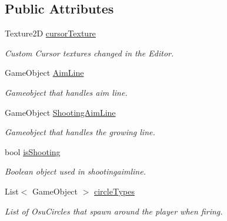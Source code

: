\subsection*{Public Attributes}
\begin{DoxyCompactItemize}
\item 
\mbox{\label{class_u_i_controller_aac6233fbba2e67548334fcebda846b13}} 
Texture2D \hyperlink{class_u_i_controller_aac6233fbba2e67548334fcebda846b13}{cursor\+Texture}
\begin{DoxyCompactList}\small\item\em Custom Cursor textures changed in the Editor. \end{DoxyCompactList}\item 
\mbox{\label{class_u_i_controller_a06c89b8bab048dc7da9e95f83dc98512}} 
Game\+Object \hyperlink{class_u_i_controller_a06c89b8bab048dc7da9e95f83dc98512}{Aim\+Line}
\begin{DoxyCompactList}\small\item\em Gameobject that handles aim line. \end{DoxyCompactList}\item 
\mbox{\label{class_u_i_controller_a21bbf8d28555e4bbbf02eb36b3b4fd09}} 
Game\+Object \hyperlink{class_u_i_controller_a21bbf8d28555e4bbbf02eb36b3b4fd09}{Shooting\+Aim\+Line}
\begin{DoxyCompactList}\small\item\em Gameobject that handles the growing line. \end{DoxyCompactList}\item 
\mbox{\label{class_u_i_controller_a6ea44aea6d6acc117d660b518612e983}} 
bool \hyperlink{class_u_i_controller_a6ea44aea6d6acc117d660b518612e983}{is\+Shooting}
\begin{DoxyCompactList}\small\item\em Boolean object used in shootingaimline. \end{DoxyCompactList}\item 
\mbox{\label{class_u_i_controller_a9e07150f7246ddee7be0b4d07040a33d}} 
List$<$ Game\+Object $>$ \hyperlink{class_u_i_controller_a9e07150f7246ddee7be0b4d07040a33d}{circle\+Types}
\begin{DoxyCompactList}\small\item\em List of Osu\+Circles that spawn around the player when firing. \end{DoxyCompactList}\item 

\end{DoxyCompactItemize}
